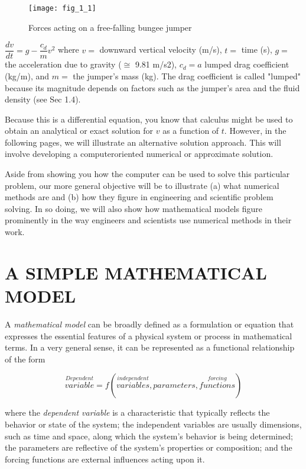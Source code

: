 \documentclass[../main.tex]{subfiles}
\begin{document}
    
\begin{wrapfigure}{l}{0.25\textwidth}
    \centering
    \texttt{[image: fig\_1\_1]}
   \caption{\textsf{Forces acting on a free-falling bungee jumper}}
   \label{fig:fig_1_1}
\end{wrapfigure}



$\dfrac{dv}{dt}=g-\dfrac{c_d}{m}v^2$
where $v =$ downward vertical velocity (m/s), $t =$ time (s), $g =$ the acceleration due to
gravity ($\cong$ 9.81 m/s2), $c_d = a$ lumped drag coefficient (kg/m), and $m =$ the jumper's
mass (kg). The drag coefficient is called "lumped" because its magnitude depends on factors such as the jumper's area and the fluid density (see Sec 1.4).


Because this is a differential equation, you know that calculus might be used to obtain
an analytical or exact solution for $v$ as a function of $t$. However, in the following pages, we
will illustrate an alternative solution approach. This will involve developing a computeroriented numerical or approximate solution.


Aside from showing you how the computer can be used to solve this particular problem, our more general objective will be to illustrate (a) what numerical methods are and
(b) how they figure in engineering and scientific problem solving. In so doing, we will also
show how mathematical models figure prominently in the way engineers and scientists use
numerical methods in their work.


\bigskip
\section{A SIMPLE MATHEMATICAL MODEL}
\label{sec:sec1}
  A \textsl{mathematical model} can be broadly defined as a formulation or equation that expresses
the essential features of a physical system or process in mathematical terms. In a very general sense, 
it can be represented as a functional relationship of the form


\begin{equation}
\tag{1.1}
\overset{Dependent}{variable} = f \left( \overset{independent}{variables},parameters,\overset{forcing}{functions}\right)  
\end{equation}
 
where the \textsl{dependent variable} is a characteristic that typically reflects the behavior or state
of the system; the independent variables are usually dimensions, such as time and space,
along which the system's behavior is being determined; the parameters are reflective of the
system's properties or composition; and the forcing functions are external influences acting
upon it.
\end{document}
